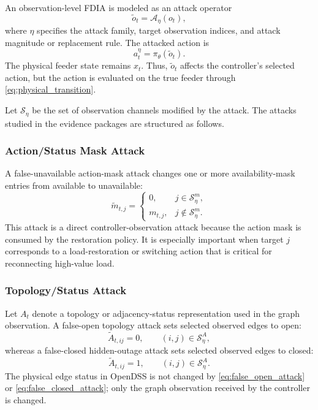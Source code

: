 An observation-level FDIA is modeled as an attack operator
\begin{equation}
    \tilde{o}_t = \mathcal{A}_{\eta}(o_t),
    \label{eq:attack_operator}
\end{equation}
where $\eta$ specifies the attack family, target observation indices, and attack magnitude or replacement rule. The attacked action is
\begin{equation}
    a_t^{\eta} = \pi_{\theta}(\tilde{o}_t).
    \label{eq:attacked_action}
\end{equation}
The physical feeder state remains $x_t$. Thus, $\tilde{o}_t$ affects the controller's selected action, but the action is evaluated on the true feeder through \eqref{eq:physical_transition}.

Let $\mathcal{S}_{\eta}$ be the set of observation channels modified by the attack. The attacks studied in the evidence packages are structured as follows.

\subsubsection{Action/Status Mask Attack}

A false-unavailable action-mask attack changes one or more availability-mask entries from available to unavailable:
\begin{equation}
    \tilde{m}_{t,j}
    =
    \begin{cases}
        0, & j \in \mathcal{S}_{\eta}^{m},\\
        m_{t,j}, & j \notin \mathcal{S}_{\eta}^{m}.
    \end{cases}
    \label{eq:action_mask_attack}
\end{equation}
This attack is a direct controller-observation attack because the action mask is consumed by the restoration policy. It is especially important when target $j$ corresponds to a load-restoration or switching action that is critical for reconnecting high-value load.

\subsubsection{Topology/Status Attack}

Let $A_t$ denote a topology or adjacency-status representation used in the graph observation. A false-open topology attack sets selected observed edges to open:
\begin{equation}
    \tilde{A}_{t,ij} = 0,
    \qquad
    (i,j) \in \mathcal{S}_{\eta}^{A},
    \label{eq:false_open_attack}
\end{equation}
whereas a false-closed hidden-outage attack sets selected observed edges to closed:
\begin{equation}
    \tilde{A}_{t,ij} = 1,
    \qquad
    (i,j) \in \mathcal{S}_{\eta}^{A}.
    \label{eq:false_closed_attack}
\end{equation}
The physical edge status in OpenDSS is not changed by \eqref{eq:false_open_attack} or \eqref{eq:false_closed_attack}; only the graph observation received by the controller is changed.

